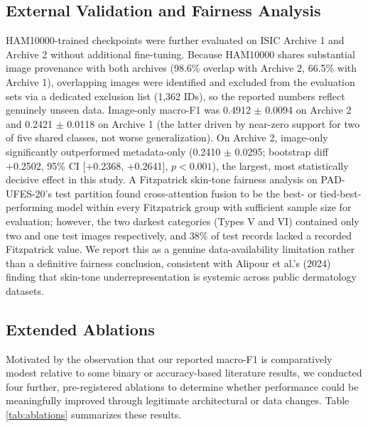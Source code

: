 \documentclass[conference]{IEEEtran}
\begin{document}
\subsection{External Validation and Fairness Analysis}
HAM10000-trained checkpoints were further evaluated on ISIC Archive 1 and Archive 2 without additional fine-tuning. Because HAM10000 shares substantial image provenance with both archives (98.6\% overlap with Archive 2, 66.5\% with Archive 1), overlapping images were identified and excluded from the evaluation sets via a dedicated exclusion list (1,362 IDs), so the reported numbers reflect genuinely unseen data. Image-only macro-F1 was 0.4912 $\pm$ 0.0094 on Archive 2 and 0.2421 $\pm$ 0.0118 on Archive 1 (the latter driven by near-zero support for two of five shared classes, not worse generalization). On Archive 2, image-only significantly outperformed metadata-only (0.2410 $\pm$ 0.0295; bootstrap diff +0.2502, 95\% CI [+0.2368, +0.2641], $p<0.001$), the largest, most statistically decisive effect in this study. A Fitzpatrick skin-tone fairness analysis on PAD-UFES-20's test partition found cross-attention fusion to be the best- or tied-best-performing model within every Fitzpatrick group with sufficient sample size for evaluation; however, the two darkest categories (Types V and VI) contained only two and one test images respectively, and 38\% of test records lacked a recorded Fitzpatrick value. We report this as a genuine data-availability limitation rather than a definitive fairness conclusion, consistent with Alipour et al.'s (2024) finding that skin-tone underrepresentation is systemic across public dermatology datasets.

\subsection{Extended Ablations}
Motivated by the observation that our reported macro-F1 is comparatively modest relative to some binary or accuracy-based literature results, we conducted four further, pre-registered ablations to determine whether performance could be meaningfully improved through legitimate architectural or data changes. Table \ref{tab:ablations} summarizes these results.
\end{document}
